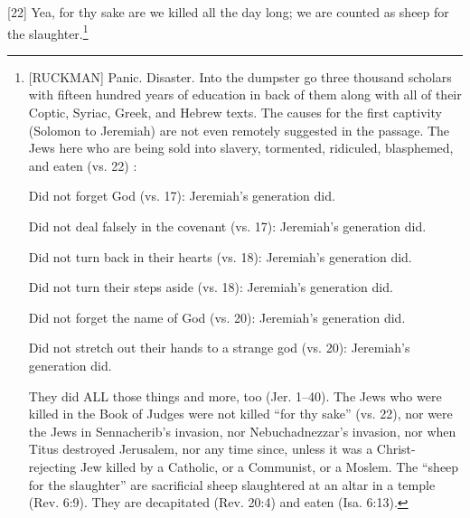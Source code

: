 [22] \textcolor[rgb]{0.00,0.00,1.00}{Yea, for thy sake are we killed all the day long; we are counted as sheep for the slaughter.}\footnote{[RUCKMAN] Panic. Disaster. Into the dumpster go three thousand scholars with fifteen hundred years of education in back of them along with all of their Coptic, Syriac, Greek, and Hebrew texts. The causes for the first captivity (Solomon to Jeremiah) are not even remotely suggested in the passage. The Jews here who are being sold into slavery, tormented, ridiculed, blasphemed, and eaten (vs. 22)  \cite{Ruckman1992Psalms}   :\begin{compactenum}
\item Did not forget God (vs. 17): Jeremiah’s generation did. 
\item Did not deal falsely in the covenant (vs. 17): Jeremiah’s generation did.
\item Did not turn back in their hearts (vs. 18): Jeremiah’s generation did.
\item Did not turn their steps aside (vs. 18): Jeremiah’s generation did.
\item Did not forget the name of God (vs. 20): Jeremiah’s generation did.
\item Did not stretch out their hands to a strange god (vs. 20): Jeremiah’s generation did.
\end{compactenum} 
They did ALL those things and more, too (Jer. 1–40).  The Jews who were killed in the Book of Judges were not killed “for thy sake” (vs. 22), nor were the Jews in Sennacherib’s invasion, nor Nebuchadnezzar’s invasion, nor when Titus destroyed Jerusalem, nor any time since, unless it was a Christ-rejecting Jew killed by a Catholic, or a Communist, or a Moslem. The “sheep for the slaughter” are sacrificial sheep slaughtered at an altar in a temple (Rev. 6:9). They are decapitated (Rev. 20:4) and eaten (Isa. 6:13).}
